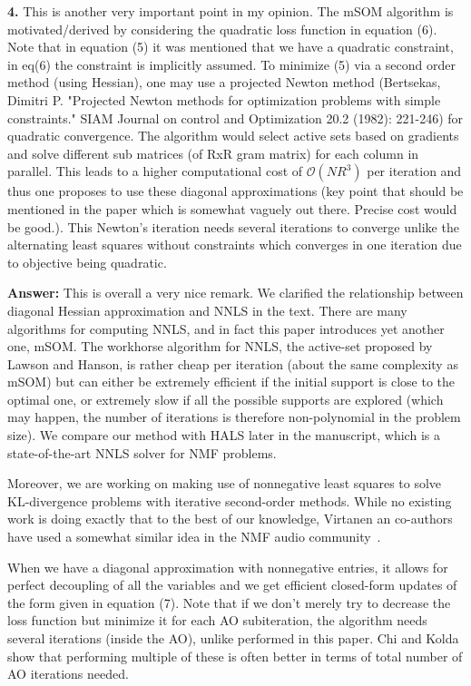 \documentclass[10pt]{article} %
\newcommand{\answer}[1]{{\textbf{Answer:} \color{blue} #1}}
\begin{document}
\textbf{4.} This is another very important point in my opinion. The mSOM algorithm is motivated/derived by considering the quadratic loss function in equation (6). Note that in equation (5) it was mentioned that we have a quadratic constraint, in eq(6) the constraint is implicitly assumed. To minimize (5) via a second order method (using Hessian), one may use a projected Newton method (Bertsekas, Dimitri P. "Projected Newton methods for optimization problems with simple constraints." SIAM Journal on control and Optimization 20.2 (1982): 221-246) for quadratic convergence. The algorithm would select active sets based on gradients and solve different sub matrices (of RxR gram matrix) for each column in parallel. This leads to a higher computational cost of $\mathcal{O}(NR^3)$ per iteration and thus one proposes to use these diagonal approximations (key point that should be mentioned in the paper which is somewhat vaguely out there. Precise cost would be good.). This Newton's iteration needs several iterations to converge unlike the alternating least squares without constraints which converges in one iteration due to objective being quadratic.

\answer{This is overall a very nice remark. We clarified the relationship between diagonal Hessian approximation and NNLS in the text. There are many algorithms for computing NNLS, and in fact this paper introduces yet another one, mSOM. The workhorse algorithm for NNLS, the active-set proposed by Lawson and Hanson, is rather cheap per iteration (about the same complexity as mSOM) but can either be extremely efficient if the initial support is close to the optimal one, or extremely slow if all the possible supports are explored (which may happen, the number of iterations is therefore non-polynomial in the problem size). We compare our method with HALS later in the manuscript, which is a state-of-the-art NNLS solver for NMF problems.

Moreover, we are working on making use of nonnegative least squares to solve KL-divergence problems with iterative second-order methods. While no existing work is doing exactly that to the best of our knowledge, Virtanen an co-authors have used a somewhat similar idea in the NMF audio community~\cite{virtanenActiveSetNewtonAlgorithm2013}.
}

When we have a diagonal approximation with nonnegative entries, it allows for perfect decoupling of all the variables and we get efficient closed-form updates of the form given in equation (7). Note that if we don't merely try to decrease the loss function but minimize it for each AO subiteration, the algorithm needs several iterations (inside the AO), unlike performed in this paper. Chi and Kolda show that performing multiple of these is often better in terms of total number of AO iterations needed.
\end{document}
